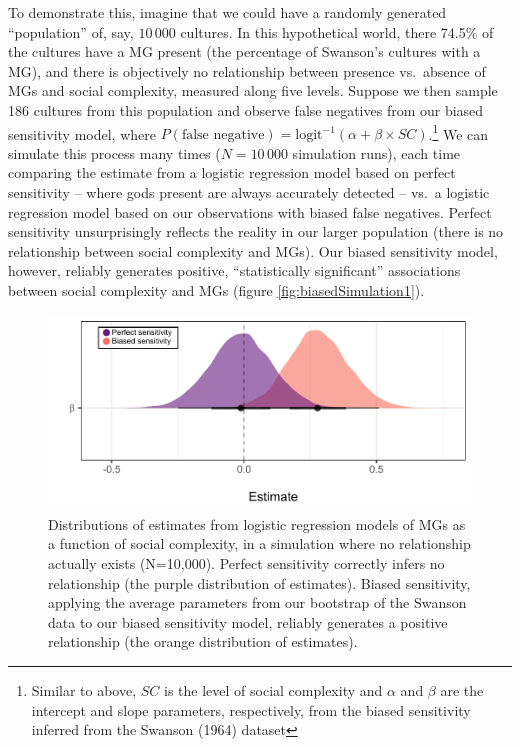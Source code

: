 \documentclass[
]{article}
\begin{document}
To demonstrate this, imagine that we could have a randomly generated ``population'' of, say, \(10\,000\) cultures. In this hypothetical world, there 74.5\% of the cultures have a MG present (the percentage of Swanson's cultures with a MG), and there is objectively no relationship between presence vs.~absence of MGs and social complexity, measured along five levels. Suppose we then sample 186 cultures from this population and observe false negatives from our biased sensitivity model, where \(P(\text{false negative}) = \text{logit}^{-1}(\alpha+\beta \times SC)\).\footnote{Similar to above, $SC$ is the level of social complexity and $\alpha$ and $\beta$ are the intercept and slope parameters, respectively, from the biased sensitivity inferred from the Swanson (1964) dataset} We can simulate this process many times (\(N=10\,000\) simulation runs), each time comparing the estimate from a logistic regression model based on perfect sensitivity -- where gods present are always accurately detected -- vs.~a logistic regression model based on our observations with biased false negatives. Perfect sensitivity unsurprisingly reflects the reality in our larger population (there is no relationship between social complexity and MGs). Our biased sensitivity model, however, reliably generates positive, ``statistically significant'' associations between social complexity and MGs (figure \ref{fig:biasedSimulation1}).

\begin{figure}
\centering
\includegraphics{mhg-writeup_files/figure-latex/biasedSimuation1-1.pdf}
\caption{\label{fig:biasedSimuation1}Distributions of estimates from logistic regression models of MGs as a function of social complexity, in a simulation where no relationship actually exists (N=10,000). Perfect sensitivity correctly infers no relationship (the purple distribution of estimates). Biased sensitivity, applying the average parameters from our bootstrap of the Swanson data to our biased sensitivity model, reliably generates a positive relationship (the orange distribution of estimates).}
\end{figure}
\end{document}
